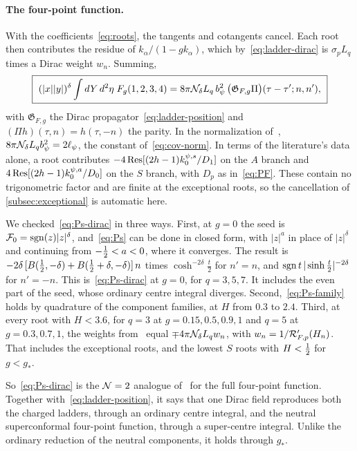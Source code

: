\paragraph{The four-point function.} With the coefficients~\eqref{eq:roots}, the tangents and cotangents cancel. Each root then contributes the residue of $k_\alpha/(1-gk_\alpha)$, which by~\eqref{eq:ladder-dirac} is $\sigma_pL_q$ times a Dirac weight $w_n$. Summing,
\begin{equation}\label{eq:Ps-dirac}
\boxed{\ (|x||y|)^\delta\int dY\,d^2\eta\;F_g(1,2,3,4)=8\pi\cN_\delta L_q\,b_\psi^2\,\big(\mathfrak G_{F,g}\Pi\big)(\tau-\tau';n,n'),\ }
\end{equation}
with $\mathfrak G_{F,g}$ the Dirac propagator~\eqref{eq:ladder-position} and $(\Pi h)(\tau,n)=h(\tau,-n)$ the parity. In the normalization of~\cite{Peng:2017spg}, $8\pi\mathcal{N}_\delta L_qb_\psi^2=2\ell_\psi$, the constant of~\eqref{eq:cov-norm}. In terms of the literature's data alone, a root contributes $-4\operatorname*{Res}[(2h-1)k_0^{\psi,s}/D_1]$ on the $A$ branch and $4\operatorname*{Res}[(2h-1)k_0^{\psi,a}/D_0]$ on the $S$ branch, with $D_p$ as in~\eqref{eq:PF}. These contain no trigonometric factor and are finite at the exceptional roots, so the cancellation of \cref{subsec:exceptional} is automatic here.

We checked~\eqref{eq:Ps-dirac} in three ways. First, at $g=0$ the seed is $\mathcal F_0=\operatorname{sgn}(z)|z|^\delta$, and~\eqref{eq:Ps} can be done in closed form, with $|z|^a$ in place of $|z|^\delta$ and continuing from $-\tfrac12<a<0$, where it converges. The result is $-2\delta\,[B(\tfrac12,-\delta)+B(\tfrac12+\delta,-\delta)]\,n$ times $\cosh^{-2\delta}\frac t2$ for $n'=n$, and $\operatorname{sgn} t\,|\sinh\frac t2|^{-2\delta}$ for $n'=-n$. This is~\eqref{eq:Ps-dirac} at $g=0$, for $q=3,5,7$. It includes the even part of the seed, whose ordinary centre integral diverges. Second,~\eqref{eq:Ps-family} holds by quadrature of the component families, at $H$ from $0.3$ to $2.4$. Third, at every root with $H<3.6$, for $q=3$ at $g=0.15,0.5,0.9,1$ and $q=5$ at $g=0.3,0.7,1$, the weights from~\cite{Peng:2017spg} equal $\mp4\pi\mathcal{N}_\delta L_qw_n$, with $w_n=1/\mathcal{R}_{F,p}'(H_n)$. That includes the exceptional roots, and the lowest $S$ roots with $H<\tfrac12$ for $g<g_*$.

So~\eqref{eq:Ps-dirac} is the $\mathcal{N}=2$ analogue of~\cite[(3.11)]{Thong:2026} for the full four-point function. Together with~\eqref{eq:ladder-position}, it says that one Dirac field reproduces both the charged ladders, through an ordinary centre integral, and the neutral superconformal four-point function, through a super-centre integral. Unlike the ordinary reduction of the neutral components, it holds through $g_*$.

